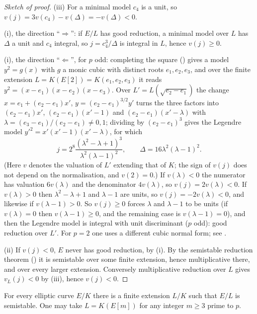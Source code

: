 \begin{proof}[Sketch of proof]
(iii) For a minimal model $c_4$ is a unit, so $v(j)=3v(c_4)-v(\Delta)=-v(\Delta)<0$.

(i), the direction ``$\Rightarrow$'': if $E/L$ has good reduction, a minimal model over $L$ has $\Delta$ a unit and
$c_4$ integral, so $j=c_4^3/\Delta$ is integral in $L$, hence $v(j)\ge0$.

(i), the direction ``$\Leftarrow$'', for $p$ odd: completing the square () gives a model $y^2=g(x)$ with $g$
a monic cubic with distinct roots $e_1,e_2,e_3$, and over the finite extension $L=K(E[2])=K(e_1,e_2,e_3)$ it reads
$y^2=(x-e_1)(x-e_2)(x-e_3)$. Over $L'=L(\sqrt{e_2-e_1})$ the change $x=e_1+(e_2-e_1)x'$, $y=(e_2-e_1)^{3/2}y'$ turns the three
factors into $(e_2-e_1)x'$, $(e_2-e_1)(x'-1)$ and $(e_2-e_1)(x'-\lambda)$ with $\lambda=(e_3-e_1)/(e_2-e_1)\ne0,1$; dividing by
$(e_2-e_1)^3$ gives the Legendre model $y'^2=x'(x'-1)(x'-\lambda)$, for which
\[
j=2^8\frac{(\lambda^2-\lambda+1)^3}{\lambda^2(\lambda-1)^2},\qquad\Delta=16\lambda^2(\lambda-1)^2 .
\]
(Here $v$ denotes the valuation of $L'$ extending that of $K$; the sign of $v(j)$ does not depend on the normalisation, and $v(2)=0$.)
If $v(\lambda)<0$ the numerator has valuation $6v(\lambda)$ and the denominator $4v(\lambda)$, so $v(j)=2v(\lambda)<0$. If
$v(\lambda)>0$ then $\lambda^2-\lambda+1$ and $\lambda-1$ are units, so $v(j)=-2v(\lambda)<0$, and likewise if $v(\lambda-1)>0$. So $v(j)\ge0$ forces $\lambda$ and $\lambda-1$ to be
units (if $v(\lambda)=0$ then $v(\lambda-1)\ge0$, and the remaining case is $v(\lambda-1)=0$), and then the Legendre model is
integral with unit discriminant ($p$ odd): good reduction over $L'$. For $p=2$
one uses a different cubic normal form; see \cite[VII.5.5]{SilvermanAEC}.

(ii) If $v(j)<0$, $E$ never has good reduction, by (i). By the semistable reduction theorem
() it is semistable over some finite extension, hence multiplicative there, and
over every larger extension. Conversely multiplicative reduction over $L$ gives $v_L(j)<0$ by (iii), hence
$v(j)<0$.
\end{proof}

\begin{theorem}\label{thm:reduction:semistable}
For every elliptic curve $E/K$ there is a finite extension $L/K$ such that $E/L$ is semistable. One may take
$L=K(E[m])$ for any integer $m\ge3$ prime to $p$.
\end{theorem}

